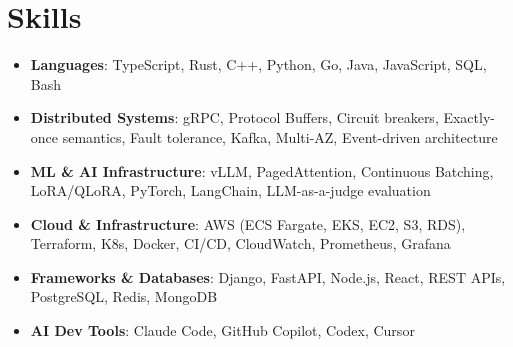 \documentclass[letterpaper,11pt]{article}
\newcommand{\resumeSubHeadingListStart}{\begin{itemize}[leftmargin=0.15in, label={}]}
\newcommand{\resumeSubHeadingListEnd}{\end{itemize}}
\newcommand{\resumeSkillHeading}[2]{%
  \item\small{\textbf{#1}: #2 \vspace{-9pt}}%
}
\begin{document}
\section{Skills}
  \resumeSubHeadingListStart
    \resumeSkillHeading{Languages}{TypeScript, Rust, C++, Python, Go, Java, JavaScript, SQL, Bash}
    \resumeSkillHeading{Distributed Systems}{gRPC, Protocol Buffers, Circuit breakers, Exactly-once semantics, Fault tolerance, Kafka, Multi-AZ, Event-driven architecture}
    \resumeSkillHeading{ML \& AI Infrastructure}{vLLM, PagedAttention, Continuous Batching, LoRA/QLoRA, PyTorch, LangChain, LLM-as-a-judge evaluation}
    \resumeSkillHeading{Cloud \& Infrastructure}{AWS (ECS Fargate, EKS, EC2, S3, RDS), Terraform, K8s, Docker, CI/CD, CloudWatch, Prometheus, Grafana}
    \resumeSkillHeading{Frameworks \& Databases}{Django, FastAPI, Node.js, React, REST APIs, PostgreSQL, Redis, MongoDB}
    \resumeSkillHeading{AI Dev Tools}{Claude Code, GitHub Copilot, Codex, Cursor}
  \resumeSubHeadingListEnd
\end{document}
